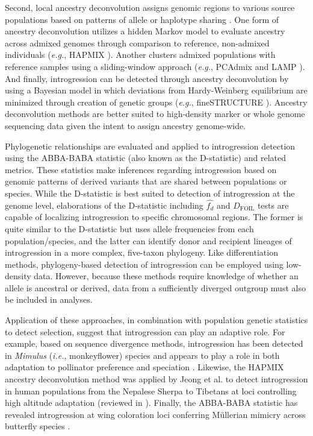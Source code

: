 \documentclass[11pt]{article}
\begin{document}
Second, local ancestry deconvolution assigns genomic regions to various source populations based on patterns of allele or haplotype sharing \cite{schraiber2015}. 
One form of ancestry deconvolution utilizes a hidden Markov model to evaluate ancestry across admixed genomes through comparison to reference, non-admixed individuals (\emph{e.g.}, HAPMIX \cite{Price2009}). 
Another clusters admixed populations with reference samples using a sliding-window approach (\emph{e.g.}, PCAdmix \cite{brisbin2012pcadmix} and LAMP \cite{sankararaman2008}).
And finally, introgression can be detected through ancestry deconvolution by using a Bayesian model \cite{pritchard2000} in which deviations from Hardy-Weinberg equilibrium are minimized through creation of genetic groups (\emph{e.g.}, fineSTRUCTURE \cite{Lawson2012}).
Ancestry deconvolution methods are better suited to high-density marker or whole genome sequencing data given the intent to assign ancestry genome-wide.

Phylogenetic relationships are evaluated and applied to introgression detection using the ABBA-BABA statistic (also known as the D-statistic) and related metrics.
These statistics make inferences regarding introgression based on genomic patterns of derived variants that are shared between populations or species.
While the D-statistic is best suited to detection of introgression at the genome level, elaborations of the D-statistic including $\hat{f_{d}}$ \cite{martin2015} and $D_{\textrm{FOIL}}$ tests \cite{pease2015} are capable of localizing introgression to specific chromosomal regions. 
The former is quite similar to the D-statistic but uses allele frequencies from each population/species, and the latter can identify donor and recipient lineages of introgression in a more complex, five-taxon phylogeny.
Like differentiation methods, phylogeny-based detection of introgression can be employed using low-density data.
However, because these methods require knowledge of whether an allele is ancestral or derived, data from a sufficiently diverged outgroup must also be included in analyses.

Application of these approaches, in combination with population genetic statistics to detect selection, suggest that introgression can play an adaptive role.
For example, based on sequence divergence methods, introgression has been detected in \emph{Mimulus} (\emph{i.e.}, monkeyflower) species and appears to play a role in both adaptation to pollinator preference and speciation \cite{Stankowski2015}.
Likewise, the HAPMIX ancestry deconvolution method was applied by Jeong et al. \cite{jeong2014} to detect introgression in human populations from the Nepalese Sherpa to Tibetans at loci controlling high altitude adaptation (reviewed in \cite{Racimo2015}).
Finally, the ABBA-BABA statistic has revealed introgression at wing coloration loci conferring M\"{u}llerian mimicry across butterfly species \cite{heliconius2012}.
\end{document}
